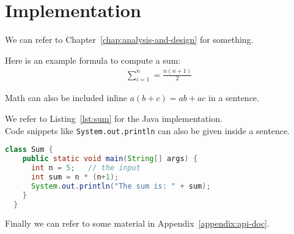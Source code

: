 \chapter{Implementation}
\label{chap:implementation}

We can refer to Chapter~\ref{chap:analysis-and-design} for something.

\bigskip

Here is an example formula to compute a sum:
%
\begin{align*}
  \sum_{i=1}^{n} = \frac{n (n+1)}{2}
\end{align*}

Math can also be included inline $a (b + c) = a b + a c$ in a sentence.

\bigskip
We refer to Listing~\ref{lst:sum} for the Java implementation.\\ %
Code snippets like \lstinline{System.out.println} can also be given inside a sentence.

\begin{lstlisting}[language=java,caption={Our sum implementation},float=tb,label=lst:sum]
  class Sum {
    public static void main(String[] args) {
      int n = 5;   // the input
      int sum = n * (n+1);
      System.out.println("The sum is: " + sum);
    }
  }
\end{lstlisting}

\bigskip

Finally we can refer to some material in Appendix~\ref{appendix:api-doc}. 

